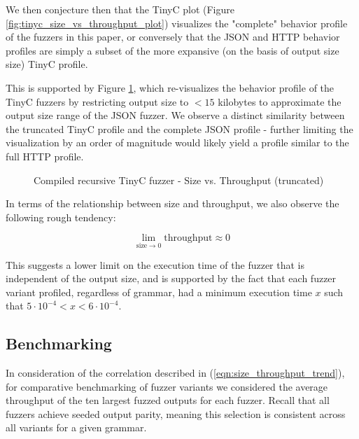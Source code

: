 \documentclass[8pt, twoside]{extarticle}
\begin{document}
We then conjecture then that the TinyC plot (Figure \ref{fig:tinyc_size_vs_throughput_plot}) visualizes the "complete" behavior profile of the fuzzers in this paper, or conversely that the JSON and HTTP behavior profiles are simply a subset of the more expansive (on the basis of output size size) TinyC profile. 

This is supported by Figure \ref{fig:tinyc_size_vs_throughput_plot_truncated}, which re-visualizes the behavior profile of the TinyC fuzzers by restricting output size to $<15$ kilobytes to approximate the output size range of the JSON fuzzer. We observe a distinct similarity between the truncated TinyC profile and the complete JSON profile - further limiting the visualization by an order of magnitude would likely yield a profile similar to the full HTTP profile.

\begin{figure}[hbt!]
	\centering

	
	\caption{Compiled recursive TinyC fuzzer - Size vs. Throughput (truncated)}
	\label{fig:tinyc_size_vs_throughput_plot_truncated}
\end{figure}

In terms of the relationship between size and throughput, we also observe the following rough tendency:

\begin{equation} \label{eqn:size_throughput_trend}
	\lim_{\text{size}\to0} \text{throughput} \approx 0
\end{equation}

This suggests a lower limit on the execution time of the fuzzer that is independent of the output size, and is supported by the fact that each fuzzer variant profiled, regardless of grammar, had a minimum execution time $x$ such that $5 \cdot 10^{-4} < x < 6 \cdot 10^{-4}$.

\subsection{Benchmarking}

In consideration of the correlation described in (\ref{eqn:size_throughput_trend}), for comparative benchmarking of fuzzer variants we considered the average throughput of the ten largest fuzzed outputs for each fuzzer. Recall that all fuzzers achieve seeded output parity, meaning this selection is consistent across all variants for a given grammar. 
\end{document}
